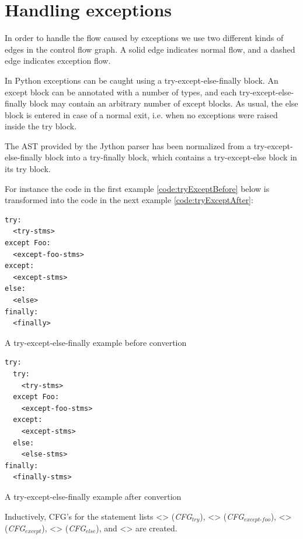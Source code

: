 \section{Handling exceptions}
In order to handle the flow caused by exceptions we use two different kinds of edges in the control flow graph. 
A solid edge indicates normal flow, and a dashed edge indicates exception flow. 

In Python exceptions can be caught using a try-except-else-finally block. An except block can be annotated with a number of types, 
and each try-except-else-finally block may contain an arbitrary number of except blocks. As usual, the else block is entered in case of a normal exit, 
i.e. when no exceptions were raised inside the try block.

The AST provided by the Jython parser has been normalized from a try-except-else-finally block into a try-finally block, 
which contains a try-except-else block in its try block.

For instance the code in the first example \ref{code:tryExceptBefore} below is transformed into the code in the next example \ref{code:tryExceptAfter}:

\begin{listing}[H]
	\begin{verbatim}
try:
  <try-stms>
except Foo:
  <except-foo-stms>
except:
  <except-stms>
else: 
  <else>
finally:
  <finally>
	\end{verbatim}
	\caption{A try-except-else-finally example before convertion}\label{code:tryExceptBefore}
\end{listing}

\begin{listing}[H]
	\begin{verbatim}
try: 
  try:
    <try-stms>
  except Foo:
    <except-foo-stms>
  except:
    <except-stms>
  else:
    <else-stms>
finally:
  <finally-stms>
	\end{verbatim}
	\caption{A try-except-else-finally example after convertion}\label{code:tryExceptAfter}
\end{listing}

\begin{sloppypar}
  Inductively, CFG's for the statement lists <> (\textit{CFG$_{\textit{try}}$}), 
  <> (\textit{CFG$_{\textit{except-foo}}$}), <> (\textit{CFG$_{\textit{except}}$}), 
  <> (\textit{CFG$_{\textit{else}}$}), and <> are created. 
\end{sloppypar}


